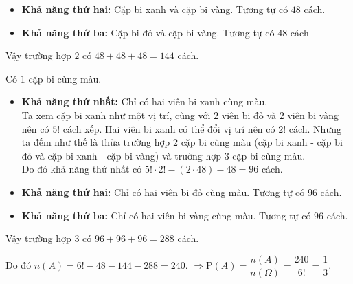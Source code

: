 \begin{vd}
{\begin{description}
\begin{itemize}
			Do đó khả năng thứ nhất có $4! \cdot 2! \cdot 2! - 48=48$ cách.
			\item \textbf{Khả năng thứ hai:} Cặp bi xanh và cặp bi vàng. Tương tự có $48$ cách.
			\item \textbf{Khả năng thứ ba:} Cặp bi đỏ và cặp bi vàng. Tương tự có $48$ cách
		\end{itemize}
		Vậy trường hợp $2$ có $48 + 48 + 48 = 144$ cách.
		\item[TH3.] Có $1$ cặp bi cùng màu.
		\begin{itemize}
			\item \textbf{Khả năng thứ nhất:} Chỉ có hai viên bi xanh cùng màu.\\
			Ta xem cặp bi xanh như một vị trí, cùng với $2$ viên bi đỏ và $2$ viên bi vàng nên có $5!$ cách xếp. Hai viên bi xanh có thể đổi vị trí nên có $2!$ cách. Nhưng ta đếm như thế là thừa trường hợp $2$ cặp bi cùng màu (cặp bi xanh - cặp bi đỏ và cặp bi xanh - cặp bi vàng) và trường hợp $3$ cặp bi cùng màu.\\
			Do đó khả năng thứ nhất có $5! \cdot 2! -(2\cdot 48 ) - 48 = 96$ cách.
			\item \textbf{Khả năng thứ hai:} Chỉ có hai viên bi đỏ cùng màu. Tương tự có $96$ cách.
			\item \textbf{Khả năng thứ ba:} Chỉ có hai viên bi vàng cùng màu. Tương tự có $96$ cách.
		\end{itemize}
		Vậy trường hợp $3$ có $96 + 96 +96 = 288$ cách.
	\end{description}
	Do đó $n(A)= 6! - 48 - 144 - 288 = 240$. 
	$\Rightarrow \mathrm{P}(A)=\dfrac{n(A)}{n(\Omega) }= \dfrac{240}{6!}= \dfrac{1}{3}$. 
}
\end{vd}
